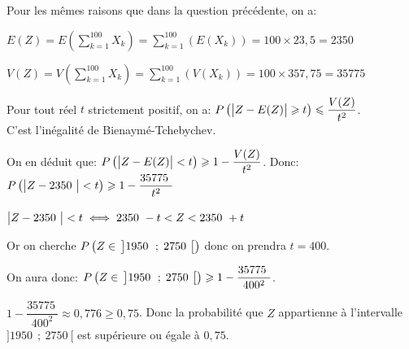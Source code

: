 \documentclass[10pt]{article}
\providecommand{\np}[2][]{{#2~#1}}
\providecommand{\ds}{\displaystyle}
\begin{document}
\begin{enumerate}
\begin{list}{\textbullet}{Pour les mêmes raisons que dans la question précédente, on a:}
\item
$ E\left (Z\right ) 
= E\left (\ds\sum_{k=1}^{100} X_k \right ) 
= \ds\sum_{k=1}^{100} \left (E\left (X_k\right )\right ) 
= 100\times 23,5 = \np{2350}$
\item
$ V\left (Z\right ) 
= V\left (\ds\sum_{k=1}^{100} X_k \right ) 
= \ds\sum_{k=1}^{100} \left (V\left (X_k\right )\right ) 
= 100\times 357,75 = \np{35775}$	
\end{list}

Pour tout réel $t$  strictement positif, on a:
$P\left ( \left | Z-E(Z)\strut \right | \geqslant t\right ) \leqslant \dfrac{V(Z)}{t^2}$.\\
C'est l'inégalité de Bienaymé-Tchebychev.

On en déduit que: 	$P\left ( \left | Z-E(Z)\strut \right | < t\right ) \geqslant 1- \dfrac{V(Z)}{t^2}$. Donc:
$P\left ( \left | Z- \np{2350}\strut \right | < t\right ) \geqslant 1- \dfrac{\np{35775}}{t^2}$

$\left | Z- \np{2350}\strut \right | < t
\iff \np{2350}-t < Z < \np{2350}+ t$

Or on cherche $P\left ( Z \in\, \left ] \np{1950}\;;\; \np{2750}\strut \right [\right )$ donc on prendra $t=400$.

On aura donc:
$P\left ( Z \in\, \left ] \np{1950}\;;\; \np{2750}\strut \right [\right )
\geqslant 1- \dfrac{\np{35775}}{400^2}$.

$1- \dfrac{\np{35775}}{400^2} \approx 0,776 \geqslant 0,75$.
Donc la probabilité que $Z$ appartienne à l'intervalle $]\np{1950}~;~\np{2750}[$ 
 est supérieure ou égale à $0,75$.
\end{enumerate}


\bigskip
\end{document}
